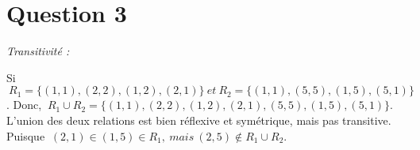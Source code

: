 \section*{Question 3}
\noindent
\emph{Transitivité :}
\bigskip

Si$\ R_1 = \{(1,1), (2,2), (1,2), (2,1)\}\ et\ R_2 = \{(1,1), (5,5), (1,5), (5,1)\}$. Donc, $\ R_1 \cup R_2 = \{(1,1), (2,2), (1,2), (2,1), (5,5), (1,5), (5,1)\}$. L'union des  deux relations est bien réflexive et symétrique, mais pas transitive. Puisque $\ (2,1)\in (1,5) \in R_1,\ mais\ (2,5) \notin R_1 \cup R_2$.